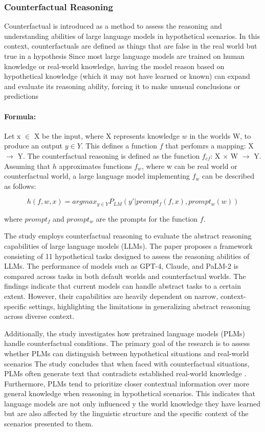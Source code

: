 \subsubsection{Counterfactual Reasoning}

Counterfactual \cite{li2023counterfactual} is introduced as a method to assess the reasoning and understanding abilities of large language models in hypothetical scenarios. 
In this context, counterfactuals are defined as things that are false in the real world but true in a hypothesis
Since most large language models are trained on human knowledge or real-world knowledge, having the model reason based on hypothetical knowledge 
(which it may not have learned or known) can expand and evaluate its reasoning ability, forcing it to make unusual conclusions or predictions


\paragraph{Formula:} Let x $\in$ X be the input, where X represents knowledge $w$ in the worlds W, to produce an output $y \in Y$. This defines a function $f$ that perfomrs
a mapping: X $\rightarrow$ Y. The counterfactual reasoning is defined as the function $f_{cf}$: X $\times$ W $\rightarrow$ Y. Assuming that $h$ approximates functions $f_w$, where w 
can be real world or counterfactual world, a large language model implementing $f_w$ can be described as follows: 

\[
h(f, w, x) = argmax_{y \in Y} P_{LM}(y' | prompt_f(f, x), prompt_w(w))
\]

where $prompt_f$ and $prompt_w$ are the prompts for the function $f$. 


The study \cite{wu2023reasoning} employs counterfactual reasoning to evaluate the abstract reasoning capabilities of large language models (LLMs). 
The paper proposes a framework consisting of 11 hypothetical tasks designed to assess the reasoning abilities of LLMs. 
The performance of models such as GPT-4, Claude, and PaLM-2 is compared across tasks in both default worlds and counterfactual worlds.
The findings indicate that current models can handle abstract tasks to a certain extent. However, their capabilities are heavily dependent on narrow, context-specific settings, 
highlighting the limitations in generalizing abstract reasoning across diverse context. 

Additionally, the study \cite{li2023counterfactual} investigates how pretrained language models (PLMs) handle counterfactual conditions. 
The primary goal of the research is to assess whether PLMs can distinguish between hypothetical situations and real-world scenarios
The study concludes that when faced with counterfactual situations, PLMs often generate text that contradicts established real-world knowledge
. Furthermore, PLMs tend to prioritize closer contextual information over more general knowledge when reasoning in hypothetical scenarios. This indicates that language models are not only influenced 
y the world knowledge they have learned but are also affected by the linguistic structure and the specific context of the scenarios presented to them.


